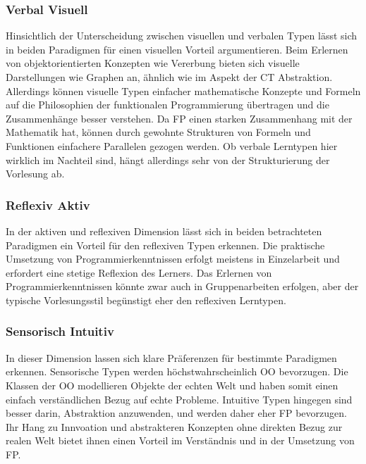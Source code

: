 \subsubsection{Verbal Visuell}
Hinsichtlich der Unterscheidung zwischen visuellen und verbalen Typen lässt sich in beiden Paradigmen für einen visuellen Vorteil argumentieren. Beim Erlernen von objektorientierten Konzepten wie Vererbung bieten sich visuelle Darstellungen wie Graphen an, ähnlich wie im Aspekt der CT Abstraktion.
Allerdings können visuelle Typen einfacher mathematische Konzepte und Formeln auf die Philosophien der funktionalen Programmierung übertragen und die Zusammenhänge besser verstehen. Da FP einen starken Zusammenhang mit der Mathematik hat, können durch gewohnte Strukturen von Formeln und Funktionen einfachere Parallelen gezogen werden.
Ob verbale Lerntypen hier wirklich im Nachteil sind, hängt allerdings sehr von der Strukturierung der Vorlesung ab.

\subsubsection{Reflexiv Aktiv}
In der aktiven und reflexiven Dimension lässt sich in beiden betrachteten Paradigmen ein Vorteil für den reflexiven Typen erkennen. Die praktische Umsetzung von Programmierkenntnissen erfolgt meistens in Einzelarbeit und erfordert eine stetige Reflexion des Lerners.
Das Erlernen von Programmierkenntnissen könnte zwar auch in Gruppenarbeiten erfolgen, aber der typische Vorlesungsstil begünstigt eher den reflexiven Lerntypen.

\subsubsection{Sensorisch Intuitiv}
In dieser Dimension lassen sich klare Präferenzen für bestimmte Paradigmen erkennen. Sensorische Typen werden höchstwahrscheinlich OO bevorzugen. Die Klassen der OO modellieren Objekte der echten Welt und haben somit einen einfach verständlichen Bezug auf echte Probleme.
Intuitive Typen hingegen sind besser darin, Abstraktion anzuwenden, und werden daher eher FP bevorzugen.
Ihr Hang zu Innvoation und abstrakteren Konzepten ohne direkten Bezug zur realen Welt bietet ihnen einen Vorteil im Verständnis und in der Umsetzung von FP.

